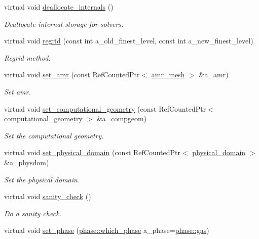 \begin{DoxyCompactItemize}
virtual void \hyperlink{classrte__layout_acd0832d24bae30c881928c1b08c70916}{deallocate\+\_\+internals} ()
\begin{DoxyCompactList}\small\item\em Deallocate internal storage for solvers. \end{DoxyCompactList}\item 
virtual void \hyperlink{classrte__layout_a87aaa4e9a7eeb268c5b7f35b9df8a201}{regrid} (const int a\+\_\+old\+\_\+finest\+\_\+level, const int a\+\_\+new\+\_\+finest\+\_\+level)
\begin{DoxyCompactList}\small\item\em Regrid method. \end{DoxyCompactList}\item 
virtual void \hyperlink{classrte__layout_a6bef1b37d812811e31fc27055e2f6fda}{set\+\_\+amr} (const Ref\+Counted\+Ptr$<$ \hyperlink{classamr__mesh}{amr\+\_\+mesh} $>$ \&a\+\_\+amr)
\begin{DoxyCompactList}\small\item\em Set amr. \end{DoxyCompactList}\item 
virtual void \hyperlink{classrte__layout_a4375884283bbba377463e38751ac22b5}{set\+\_\+computational\+\_\+geometry} (const Ref\+Counted\+Ptr$<$ \hyperlink{classcomputational__geometry}{computational\+\_\+geometry} $>$ \&a\+\_\+compgeom)
\begin{DoxyCompactList}\small\item\em Set the computational geometry. \end{DoxyCompactList}\item 
virtual void \hyperlink{classrte__layout_a17aacb73606529ab47cf4a8300679077}{set\+\_\+physical\+\_\+domain} (const Ref\+Counted\+Ptr$<$ \hyperlink{classphysical__domain}{physical\+\_\+domain} $>$ \&a\+\_\+physdom)
\begin{DoxyCompactList}\small\item\em Set the physical domain. \end{DoxyCompactList}\item 
virtual void \hyperlink{classrte__layout_aa4fb6f2a2b8d8e38d08b15bce79da813}{sanity\+\_\+check} ()
\begin{DoxyCompactList}\small\item\em Do a sanity check. \end{DoxyCompactList}\item 
virtual void \hyperlink{classrte__layout_a622ea333881cfea500a0b87017602b31}{set\+\_\+phase} (\hyperlink{namespacephase_a23c76f548a5eb1955ed8c929c541108b}{phase\+::which\+\_\+phase} a\+\_\+phase=\hyperlink{namespacephase_a23c76f548a5eb1955ed8c929c541108bad0a7c1eb8fd916c8b7ec85be0fd23b38}{phase\+::gas})

\end{DoxyCompactItemize}
